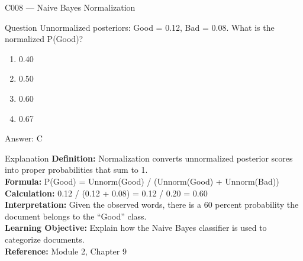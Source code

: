 \documentclass[aspectratio=169,8pt]{beamer}
\begin{document}
	\begin{frame}{C008 --- Naive Bayes Normalization}
		\begin{block}{Question}
			Unnormalized posteriors: Good = 0.12, Bad = 0.08. What is the normalized P(Good)?
			\begin{enumerate}
				\item 0.40
				\item 0.50
				\item 0.60
				\item 0.67
			\end{enumerate}
		\end{block}
		\begin{exampleblock}{Answer: C}\end{exampleblock}
		\begin{block}{Explanation}
			\textbf{Definition:} Normalization converts unnormalized posterior scores into proper probabilities that sum to 1.\\
			\textbf{Formula:} P(Good) = Unnorm(Good) / (Unnorm(Good) + Unnorm(Bad))\\
			\textbf{Calculation:} 0.12 / (0.12 + 0.08) = 0.12 / 0.20 = 0.60\\
			\textbf{Interpretation:} Given the observed words, there is a 60 percent probability the document belongs to the ``Good'' class.\\
			\textbf{Learning Objective:} Explain how the Naive Bayes classifier is used to categorize documents.\\
			\textbf{Reference:} Module 2, Chapter 9
		\end{block}
	\end{frame}
	
\end{document}
